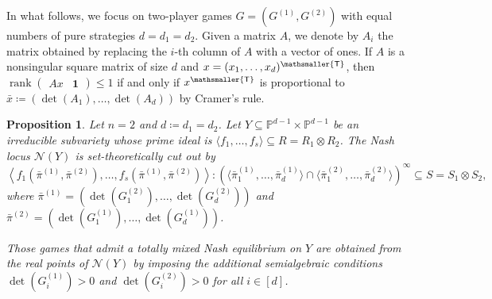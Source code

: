 \documentclass[12pt]{article}
\newtheorem{proposition}[theorem]{Proposition}
\theoremstyle{definition}
\newcommand{\PP}{{\mathbb P}}
\def\bone{{\boldsymbol{1}}}
\def\rank{\operatorname{rank}}
\newcommand{\mT}{\mathsmaller{\mathsf{T}}}
\newcommand{\kn}{{\mathcal N}}
\begin{document}
In what follows, we focus on two-player games $G=(G^{(1)},G^{(2)})$ with equal numbers of pure strategies $d=d_1=d_2$. Given a matrix $A$, we denote by $A_i$ the matrix obtained by replacing the $i$-th column of $A$ with a vector of ones. If $A$ is a nonsingular square matrix of size $d$ and $x=(x_1,\ldots,x_d)^\mT$, then $\rank\begin{pmatrix}Ax &\bone\end{pmatrix}\le 1$ if and only if $x^\mT$ is proportional to $\bar{x}\coloneqq(\det(A_1),\ldots,\det(A_d))$ by Cramer's rule.

\begin{proposition}\label{prop:eq for 2players}
Let $n=2$ and $d\coloneqq d_1=d_2$. Let $Y \subseteq \PP^{d-1}\times \PP^{d-1}$ be an irreducible subvariety whose prime ideal is $\langle f_1,\ldots,f_s\rangle\subseteq R=R_1\otimes R_2$. The Nash locus $\kn(Y)$ is set-theoretically cut out by 
\[
    \left\langle f_1(\bar{\pi}^{(1)},\bar{\pi}^{(2)}),\ldots,f_s(\bar{\pi}^{(1)},\bar{\pi}^{(2)})\right\rangle:\left(\langle \bar{\pi}^{(1)}_1,\dots,\bar{\pi}^{(1)}_d\rangle \cap \langle\bar{\pi}^{(2)}_1,\dots,\bar{\pi}^{(2)}_d\rangle\right)^\infty\subseteq S=S_1\otimes S_2,
\]
where $\bar{\pi}^{(1)} = (\det(G_1^{(2)}),\ldots,\det(G_d^{(2)}))$ and $\bar{\pi}^{(2)} = (\det(G_1^{(1)}),\ldots,\det(G_d^{(1)}))$.

Those games that admit a totally mixed Nash equilibrium on $Y$ are obtained from the real points of $\kn(Y)$ by imposing the additional semialgebraic conditions $\det(G_i^{(1)})>0$ and $\det(G_i^{(2)})>0$ for all $i\in[d]$.
\end{proposition}
\end{document}
